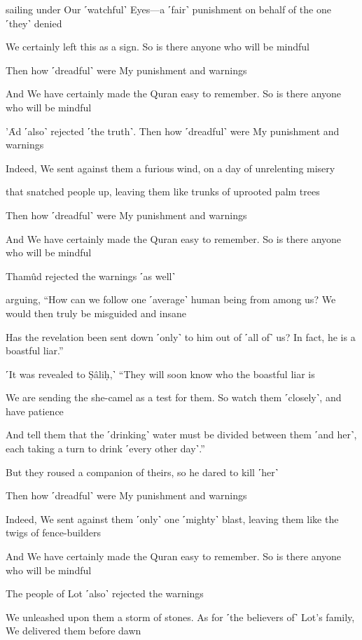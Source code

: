 sailing under Our ˹watchful˺ Eyes—a ˹fair˺ punishment on behalf of the one ˹they˺ denied

We certainly left this as a sign. So is there anyone who will be mindful

Then how ˹dreadful˺ were My punishment and warnings

And We have certainly made the Quran easy to remember. So is there anyone who will be mindful

’Ȃd ˹also˺ rejected ˹the truth˺. Then how ˹dreadful˺ were My punishment and warnings

Indeed, We sent against them a furious wind, on a day of unrelenting misery

that snatched people up, leaving them like trunks of uprooted palm trees

Then how ˹dreadful˺ were My punishment and warnings

And We have certainly made the Quran easy to remember. So is there anyone who will be mindful

Thamûd rejected the warnings ˹as well˺

arguing, “How can we follow one ˹average˺ human being from among us? We would then truly be misguided and insane

Has the revelation been sent down ˹only˺ to him out of ˹all of˺ us? In fact, he is a boastful liar.”

˹It was revealed to Ṣâliḥ,˺ “They will soon know who the boastful liar is

We are sending the she-camel as a test for them. So watch them ˹closely˺, and have patience

And tell them that the ˹drinking˺ water must be divided between them ˹and her˺, each taking a turn to drink ˹every other day˺.”

But they roused a companion of theirs, so he dared to kill ˹her˺

Then how ˹dreadful˺ were My punishment and warnings

Indeed, We sent against them ˹only˺ one ˹mighty˺ blast, leaving them like the twigs of fence-builders

And We have certainly made the Quran easy to remember. So is there anyone who will be mindful

The people of Lot ˹also˺ rejected the warnings

We unleashed upon them a storm of stones. As for ˹the believers of˺ Lot’s family, We delivered them before dawn

